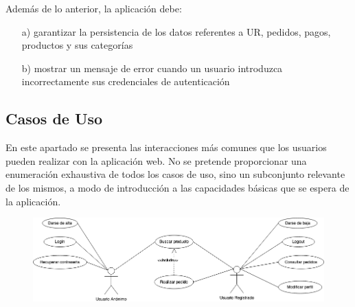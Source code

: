 \documentclass[a4paper]{report}
\begin{document}
            Además de lo anterior, la aplicación debe:
            \begin{enumerate}
                \item[a)] garantizar la persistencia de los datos referentes a UR, pedidos, pagos, productos y sus categorías
                \item[b)] mostrar un mensaje de error cuando un usuario introduzca incorrectamente sus credenciales de autenticación
            \end{enumerate}

        \subsection{Casos de Uso}
            En este apartado se presenta las interacciones más comunes que los usuarios pueden realizar con la aplicación web. No se pretende proporcionar una enumeración exhaustiva de todos los casos de uso, sino un subconjunto relevante de los mismos, a modo de introducción a las capacidades básicas que se espera de la aplicación.

            \begin{figure}[h]
                \centering
                \includegraphics[width=\textwidth]{Use-Case_Diagram}
            \end{figure}
\end{document}
